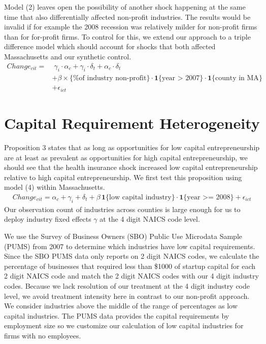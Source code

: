 Model (2) leaves open the possibility of another shock happening at the same time that also differentially affected non-profit industries. The results would be invalid if for example the 2008 recession was relatively milder for non-profit firms than for for-profit firms. To control for this, we extend our approach to a triple difference model which should account for shocks that both affected Massachusetts and our synthetic control. 
\begin{align}
Change_{cit} = & \; \gamma_i \cdot \alpha_c + \gamma_i \cdot \delta_t +  \alpha_c \cdot \delta_t \nonumber   \\
& + \beta  \times \{\text{\% of industry non-profit}\} \cdot \mathbf{1}\{\text{year > 2007}\}  \cdot \mathbf{1}\{\text{county in  MA}\} \nonumber  \\
& + \epsilon_{ict}
\end{align}



\section{Capital Requirement Heterogeneity}

Proposition 3 states that as long as opportunities for low capital entrepreneurship are at least as prevalent as opportunities for high capital entrepreneurship, we should see that the health insurance shock increased low capital entrepreneurship relative to high capital entrepreneurship. We first test this proposition using model (4) within Massachusetts. 
\begin{align}
Change_{cit} =  \alpha_c + \gamma_i+ \delta_t + \beta \, \mathbf{1}\{\text{low capital industry}\} \cdot \mathbf{1}\{\text{year >= 2008}\} + \epsilon_{ict}
\end{align}
Our observation count of industries across counties is large enough for us to deploy industry fixed effects $\gamma$ at the 4 digit NAICS code level. 

We use the Survey of Business Owners (SBO) Public Use Microdata Sample (PUMS) from 2007 to determine which industries have low capital requirements. Since the SBO PUMS data only reports on 2 digit NAICS codes, we calculate the percentage of businesses that required less than \$1000 of startup capital for each 2 digit NAICS code and match the 2 digit NAICS codes with our 4 digit industry codes. Because we lack resolution of our treatment at the 4 digit industry code level, we avoid treatment intensity here in contrast to our non-profit approach. We consider industries above the middle of the range of percentages as low capital industries. The PUMS data provides the capital requirements by employment size so we customize our calculation of low capital industries for firms with no employees. 

